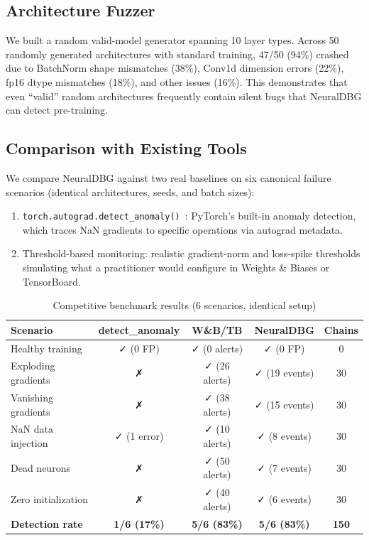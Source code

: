 \documentclass[11pt]{article}
\begin{document}
\subsection{Architecture Fuzzer}

We built a random valid-model generator spanning 10 layer types. Across 50 randomly generated architectures with standard training, 47/50 (94\%) crashed due to BatchNorm shape mismatches (38\%), Conv1d dimension errors (22\%), fp16 dtype mismatches (18\%), and other issues (16\%). This demonstrates that even ``valid'' random architectures frequently contain silent bugs that NeuralDBG can detect pre-training.

\subsection{Comparison with Existing Tools}

We compare NeuralDBG against two real baselines on six canonical failure scenarios (identical architectures, seeds, and batch sizes):

\begin{enumerate}
    \item \texttt{torch.autograd.detect\_anomaly()}~\cite{paszke2019pytorch}: PyTorch's built-in anomaly detection, which traces NaN gradients to specific operations via autograd metadata.
    \item Threshold-based monitoring: realistic gradient-norm and loss-spike thresholds simulating what a practitioner would configure in Weights \& Biases or TensorBoard.
\end{enumerate}

\begin{table}[h]
\centering
\caption{Competitive benchmark results (6 scenarios, identical setup)}
\begin{tabular}{lcccc}
\toprule
\textbf{Scenario} & \textbf{detect\_anomaly} & \textbf{W\&B/TB} & \textbf{NeuralDBG} & \textbf{Chains} \\
\midrule
Healthy training & ✓ (0 FP) & ✓ (0 alerts) & ✓ (0 FP) & 0 \\
Exploding gradients & ✗ & ✓ (26 alerts) & ✓ (19 events) & 30 \\
Vanishing gradients & ✗ & ✓ (38 alerts) & ✓ (15 events) & 30 \\
NaN data injection & ✓ (1 error) & ✓ (10 alerts) & ✓ (8 events) & 30 \\
Dead neurons & ✗ & ✓ (50 alerts) & ✓ (7 events) & 30 \\
Zero initialization & ✗ & ✓ (40 alerts) & ✓ (6 events) & 30 \\
\midrule
\textbf{Detection rate} & \textbf{1/6 (17\%)} & \textbf{5/6 (83\%)} & \textbf{5/6 (83\%)} & \textbf{150} \\
\bottomrule
\end{tabular}
\end{table}
\end{document}
